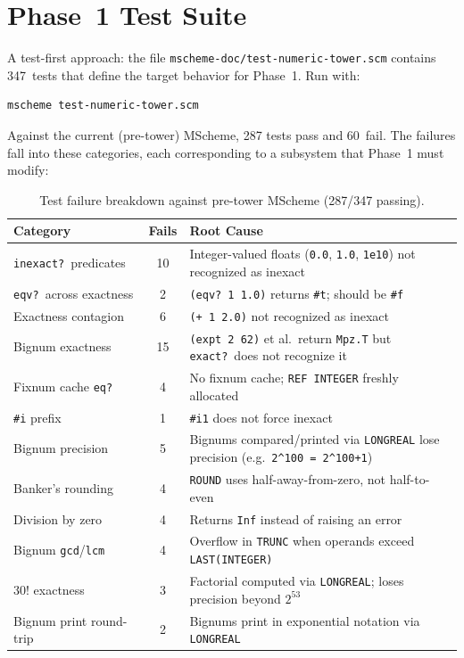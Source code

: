 \documentclass[12pt]{article}
\begin{document}
\section{Phase~1 Test Suite}
\label{sec:impl-tests}

A test-first approach: the file {\tt mscheme-doc/test-numeric-tower.scm}
contains 347~tests that define the target behavior for Phase~1.
Run with:
\begin{lstlisting}
mscheme test-numeric-tower.scm
\end{lstlisting}

\noindent Against the current (pre-tower) MScheme, 287 tests pass
and 60~fail.  The failures fall into these categories, each
corresponding to a subsystem that Phase~1 must modify:

\begin{table}[htbp]
\centering
\begin{tabular}{lcp{6.5cm}}
\toprule
\textbf{Category} & \textbf{Fails} & \textbf{Root Cause} \\
\midrule
{\tt inexact?}\ predicates &
  10 & Integer-valued floats ({\tt 0.0}, {\tt 1.0}, {\tt 1e10})
       not recognized as inexact \\
{\tt eqv?}\ across exactness &
  2 & {\tt (eqv?\ 1 1.0)} returns {\tt \#t}; should be {\tt \#f} \\
Exactness contagion &
  6 & {\tt (+ 1 2.0)} not recognized as inexact \\
Bignum exactness &
  15 & {\tt (expt 2 62)} et al.\ return {\tt Mpz.T} but
      {\tt exact?}\ does not recognize it \\
Fixnum cache {\tt eq?} &
  4 & No fixnum cache; {\tt REF INTEGER} freshly allocated \\
{\tt \#i} prefix &
  1 & {\tt \#i1} does not force inexact \\
Bignum precision &
  5 & Bignums compared/printed via {\tt LONGREAL} lose
      precision (e.g.\ {\tt 2\^{}100 = 2\^{}100+1}) \\
Banker's rounding &
  4 & {\tt ROUND} uses half-away-from-zero, not half-to-even \\
Division by zero &
  4 & Returns {\tt Inf} instead of raising an error \\
Bignum {\tt gcd}/{\tt lcm} &
  4 & Overflow in {\tt TRUNC} when operands exceed
      {\tt LAST(INTEGER)} \\
30! exactness &
  3 & Factorial computed via {\tt LONGREAL}; loses precision
      beyond $2^{53}$ \\
Bignum print round-trip &
  2 & Bignums print in exponential notation via {\tt LONGREAL} \\
\bottomrule
\end{tabular}
\caption{Test failure breakdown against pre-tower MScheme (287/347 passing).}
\label{tab:failures}
\end{table}
\end{document}

